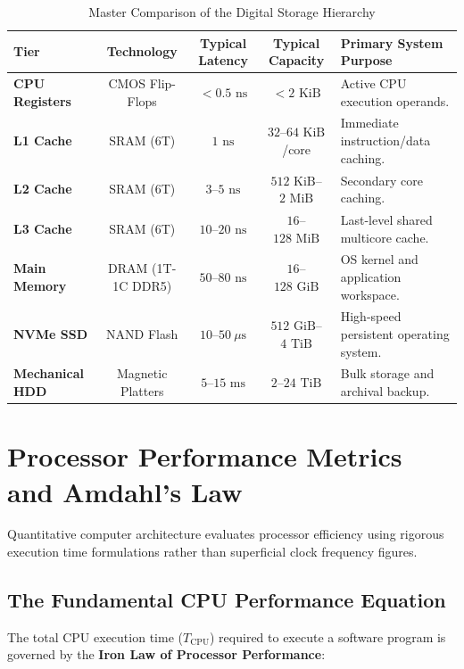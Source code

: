 \begin{table}[htbp]
\centering
\small
\caption{Master Comparison of the Digital Storage Hierarchy}
\label{tab:master_storage_matrix}
\begin{tabularx}{\textwidth}{l c c c X}
\toprule
\textbf{Tier} & \textbf{Technology} & \textbf{Typical Latency} & \textbf{Typical Capacity} & \textbf{Primary System Purpose} \\
\midrule
\textbf{CPU Registers} & CMOS Flip-Flops & $<0.5\text{ ns}$ & $<2\text{ KiB}$ & Active CPU execution operands. \\
\textbf{L1 Cache} & SRAM (6T) & $1\text{ ns}$ & $32$--$64\text{ KiB}$/core & Immediate instruction/data caching. \\
\textbf{L2 Cache} & SRAM (6T) & $3$--$5\text{ ns}$ & $512\text{ KiB}$--$2\text{ MiB}$ & Secondary core caching. \\
\textbf{L3 Cache} & SRAM (6T) & $10$--$20\text{ ns}$ & $16$--$128\text{ MiB}$ & Last-level shared multicore cache. \\
\textbf{Main Memory} & DRAM (1T-1C DDR5) & $50$--$80\text{ ns}$ & $16$--$128\text{ GiB}$ & OS kernel and application workspace. \\
\textbf{NVMe SSD} & NAND Flash & $10$--$50\ \mu\text{s}$ & $512\text{ GiB}$--$4\text{ TiB}$ & High-speed persistent operating system. \\
\textbf{Mechanical HDD} & Magnetic Platters & $5$--$15\text{ ms}$ & $2$--$24\text{ TiB}$ & Bulk storage and archival backup. \\
\bottomrule
\end{tabularx}
\end{table}



\section{Processor Performance Metrics and Amdahl's Law}
\label{sec:processor_performance}

Quantitative computer architecture evaluates processor efficiency using rigorous execution time formulations rather than superficial clock frequency figures.

\subsection{The Fundamental CPU Performance Equation}
The total CPU execution time ($T_{\text{CPU}}$) required to execute a software program is governed by the \textbf{Iron Law of Processor Performance}:


